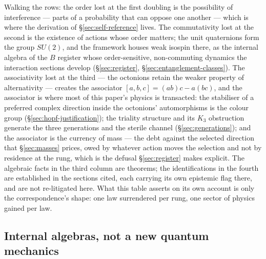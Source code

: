 Walking the rows: the order lost at the first doubling is the possibility of interference --- parts
of a probability that can oppose one another --- which is where the derivation of \S\ref{sec:self-reference}
lives. The commutativity lost at the second is the existence of actions whose order matters; the
unit quaternions form the group $SU(2)$, and the framework houses weak isospin there, as the
internal algebra of the $B$ register whose order-sensitive, non-commuting dynamics the interaction sections develop
(\S\ref{sec:register}, \S\ref{sec:entanglement-classes}). The associativity lost at the third ---
the octonions retain the weaker property of alternativity \autocite{baez2002octonions} --- creates
the associator $[a,b,c] = (ab)c - a(bc)$, and the associator is where most of this paper's physics
is transacted: the stabiliser of a preferred complex direction inside the octonions' automorphisms
is the colour group (\S\ref{sec:hopf-justification}); the triality structure and its $K_3$
obstruction generate the three generations and the sterile channel (\S\ref{sec:generations}); and
the associator is the currency of mass --- the debt against the selected direction that
\S\ref{sec:masses} prices, owed by whatever action moves the selection and not by residence at
the rung, which is the defusal \S\ref{sec:register} makes explicit. The algebraic facts
in the third column are theorems; the identifications in the fourth are established in the sections
cited, each carrying its own epistemic flag there, and are not re-litigated here. What this table
asserts on its own account is only the correspondence's shape: one law surrendered per rung, one
sector of physics gained per law.

\subsection{Internal algebras, not a new quantum mechanics}

